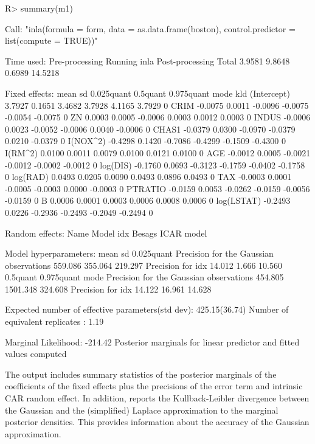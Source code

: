 \documentclass[article]{jss}
\begin{document}
\begin{Schunk}
\begin{Sinput}
R> summary(m1)
\end{Sinput}
\begin{Soutput}
Call:
"inla(formula = form, data = as.data.frame(boston), control.predictor = list(compute = TRUE))"

Time used:
 Pre-processing    Running inla Post-processing           Total 
         3.9581          9.8648          0.6989         14.5218 

Fixed effects:
               mean     sd 0.025quant 0.5quant 0.975quant    mode kld
(Intercept)  3.7927 0.1651     3.4682   3.7928     4.1165  3.7929   0
CRIM        -0.0075 0.0011    -0.0096  -0.0075    -0.0054 -0.0075   0
ZN           0.0003 0.0005    -0.0006   0.0003     0.0012  0.0003   0
INDUS       -0.0006 0.0023    -0.0052  -0.0006     0.0040 -0.0006   0
CHAS1       -0.0379 0.0300    -0.0970  -0.0379     0.0210 -0.0379   0
I(NOX^2)    -0.4298 0.1420    -0.7086  -0.4299    -0.1509 -0.4300   0
I(RM^2)      0.0100 0.0011     0.0079   0.0100     0.0121  0.0100   0
AGE         -0.0012 0.0005    -0.0021  -0.0012    -0.0002 -0.0012   0
log(DIS)    -0.1760 0.0693    -0.3123  -0.1759    -0.0402 -0.1758   0
log(RAD)     0.0493 0.0205     0.0090   0.0493     0.0896  0.0493   0
TAX         -0.0003 0.0001    -0.0005  -0.0003     0.0000 -0.0003   0
PTRATIO     -0.0159 0.0053    -0.0262  -0.0159    -0.0056 -0.0159   0
B            0.0006 0.0001     0.0003   0.0006     0.0008  0.0006   0
log(LSTAT)  -0.2493 0.0226    -0.2936  -0.2493    -0.2049 -0.2494   0

Random effects:
Name	  Model
 idx   Besags ICAR model 

Model hyperparameters:
                                        mean     sd       0.025quant
Precision for the Gaussian observations  559.086  355.064  219.297  
Precision for idx                         14.012    1.666   10.560  
                                        0.5quant 0.975quant mode    
Precision for the Gaussian observations  454.805 1501.348    324.608
Precision for idx                         14.122   16.961     14.628

Expected number of effective parameters(std dev): 425.15(36.74)
Number of equivalent replicates : 1.19 

Marginal Likelihood:  -214.42 
Posterior marginals for linear predictor and fitted values computed
\end{Soutput}
\end{Schunk}
\noindent
The output includes summary statistics of the posterior marginals of the
coefficients of the fixed effects plus the precisions of the error term and
intrinsic CAR random effect. In addition,  reports the
Kullback-Leibler divergence between the Gaussian and the (simplified)
Laplace approximation to the marginal posterior densities. This provides
information about the accuracy of the Gaussian approximation. 
\end{document}
